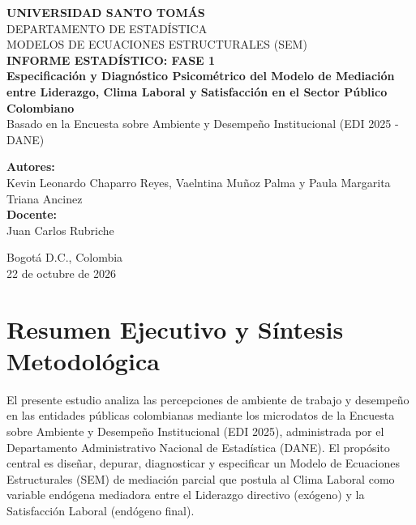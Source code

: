 \documentclass[11pt, a4paper]{article} %
\begin{document}
\begin{titlepage}
    \centering
    \vspace*{1cm}
    {\Large \textbf{UNIVERSIDAD SANTO TOMÁS}} \\
    \vspace{0.2cm}
    {\large DEPARTAMENTO DE ESTADÍSTICA} \\
    \vspace{0.2cm}
    {\large MODELOS DE ECUACIONES ESTRUCTURALES (SEM)} \\
    \vspace{2cm}
    {\Huge \textbf{INFORME ESTADÍSTICO: FASE 1}} \\
    \vspace{0.5cm}
    {\Large \textbf{Especificación y Diagnóstico Psicométrico del Modelo de Mediación entre Liderazgo, Clima Laboral y Satisfacción en el Sector Público Colombiano}} \\
    \vspace{0.2cm}
    {\large Basado en la Encuesta sobre Ambiente y Desempeño Institucional (EDI 2025 - DANE)} \\
    \vspace{2.5cm}
    \begin{minipage}{0.8\textwidth}
        \centering
        \textbf{Autores:} \\
        Kevin Leonardo Chaparro Reyes, Vaelntina Muñoz Palma y Paula Margarita Triana Ancinez \\
        \vspace{0.5cm}
        \textbf{Docente:} \\
        Juan Carlos Rubriche
    \end{minipage}
    \vfill
    {\large Bogotá D.C., Colombia \\ 22 de octubre de 2026}
\end{titlepage}

\section*{Resumen Ejecutivo y Síntesis Metodológica}

El presente estudio analiza las percepciones de ambiente de trabajo y desempeño en las entidades públicas colombianas mediante los microdatos de la Encuesta sobre Ambiente y Desempeño Institucional (EDI 2025), administrada por el Departamento Administrativo Nacional de Estadística (DANE). El propósito central es diseñar, depurar, diagnosticar y especificar un Modelo de Ecuaciones Estructurales (SEM) de mediación parcial que postula al Clima Laboral como variable endógena mediadora entre el Liderazgo directivo (exógeno) y la Satisfacción Laboral (endógeno final). 
\end{document}
